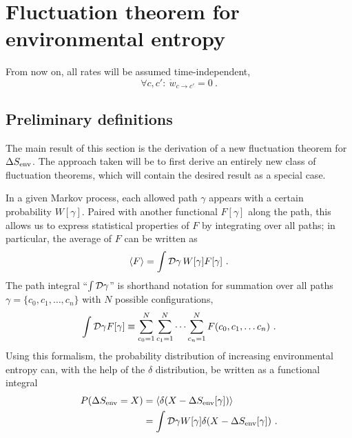 \section{Fluctuation theorem for environmental entropy}


From now on, all rates will be assumed time-independent,
\begin{equation}
	\forall c, c':~ \dot w_{c\to c'} = 0 ~.
\end{equation}



\subsection{Preliminary definitions}

The main result of this section is the derivation of a new fluctuation theorem for \(\Delta S_\text{env}\). The approach taken will be to first derive an entirely new class of fluctuation theorems, which will contain the desired result as a special case.

In a given Markov process, each allowed path \(\gamma\) appears with a certain probability \(W[\gamma]\). Paired with another functional \(F[\gamma]\) along the path, this allows us to express statistical properties of \(F\) by integrating over all paths; in particular, the average of \(F\) can be written as
%
\begin{align}
	\label{eqn:functional average}
	\langle F\rangle = \int \mathcal{D} \gamma\, W[\gamma] F[\gamma] ~.
\end{align}
%
The path integral ``\(\int \mathcal{D}\gamma\)'' is shorthand notation for summation over all paths \(\gamma = \{c_0, c_1, \ldots, c_n\}\) with \(N\) possible configurations,
%
\begin{align}
	\int \mathcal{D}\gamma F[\gamma]
	\equiv
	\sum_{c_0=1}^N\sum_{c_1=1}^N\cdots\sum_{c_n=1}^N F(c_0, c_1, \ldots c_n) ~.
\end{align}
%
Using this formalism, the probability distribution of increasing environmental entropy can, with the help of the \(\delta\) distribution, be written as a functional integral
%
\begin{equation}
	\begin{split}
	P(\Delta S_\text{env} = X)
	&= \langle \delta(X-\Delta S_\text{env}[\gamma])\rangle \\
	&= \int\mathcal{D}\gamma W[\gamma] \delta(X-\Delta S_\text{env}[\gamma])
	~.
	\end{split}
\end{equation}


